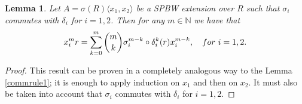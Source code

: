 \documentclass{amsart}
\newtheorem{lemma}[theorem]{Lemma}
\theoremstyle{definition}
\theoremstyle{remark}
\numberwithin{equation}{section}
\begin{document}
\begin{lemma}\label{commrule2}
Let $A = \sigma(R)\langle x_1, x_2 \rangle$ be a SPBW extension over $R$ such that $\sigma_i$ commutes with $\delta_i$ for $i = 1, 2$. Then for any $m \in \mathbb{N}$ we have that
\begin{equation*}
    x_i^mr = \sum_{k=0}^{m}\binom{m}{k}\sigma_i^{m-k}\circ\delta_i^{k}(r) x_i^{m-k}, \quad {\rm for} \ i = 1, 2.
\end{equation*}
\end{lemma}
\begin{proof}
This result can be proven in a completely analogous way to the Lemma \ref{commrule1}; it is enough to apply induction on $x_1$ and then on $x_2$. It must also be taken into account that $\sigma_i$ commutes with $\delta_i$ for $i = 1, 2$.
\end{proof}
\end{document}

